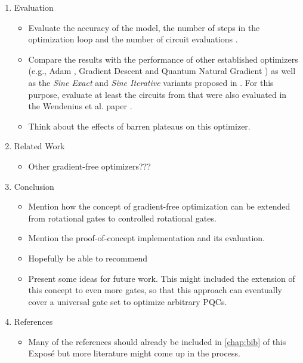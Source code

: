 \begin{enumerate}
    \item Evaluation
    \begin{itemize}
        \item
            Evaluate the accuracy of the model, the number of steps in the
            optimization loop and the number of circuit evaluations
            \cite{wendenius_gradient-free_2023}.
        \item
            Compare the results with the performance of other established
            optimizers (e.g., Adam \cite{kingma_adam_2017}, Gradient Descent and
            Quantum Natural Gradient \cite{stokes_quantum_2020}) as well as the
            \emph{Sine Exact} and \emph{Sine Iterative} variants proposed in
            \cite{wendenius_gradient-free_2023}.
            For this purpose, evaluate at least the circuits from
            \cite{sim_expressibility_2019} that were also evaluated in the
            Wendenius et al. paper \cite{wendenius_gradient-free_2023}.
        \item
            Think about the effects of barren plateaus on this optimizer.
    \end{itemize}

    \item Related Work
    \begin{itemize}
        \item Other gradient-free optimizers???
    \end{itemize}

    \item Conclusion
    \begin{itemize}
        \item
            Mention how the concept of gradient-free optimization can be
            extended from rotational gates to controlled rotational gates.
        \item
            Mention the proof-of-concept implementation and its evaluation.
        \item
            Hopefully be able to recommend 
        \item
            Present some ideas for future work.
            This might included the extension of this concept to even more
            gates, so that this approach can eventually cover a universal gate
            set to optimize arbitrary PQCs.
    \end{itemize}

    \item References
    \begin{itemize}
        \item
            Many of the references should already be included in
            \autoref{chap:bib} of this Exposé but more literature might
            come up in the process. 
    \end{itemize}
\end{enumerate}
